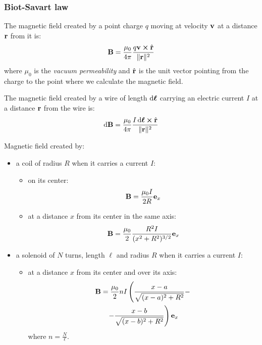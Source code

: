 \documentclass[../../../main.tex]{subfiles}
\begin{document}
\begin{multicols}{2}
  \subsubsection{Biot-Savart law}
  \begin{proposition}
    The magnetic field created by a point charge $q$ moving at velocity $\boldsymbol{\mathrm{v}}$ at a distance $\boldsymbol{\mathrm{r}}$ from it is:
    $$\vf{B}=\frac{\mu_0}{4\pi}\frac{q\vf{v}\crossprod\Hat{\vf{r}}}{\|\vf{r}\|^2}$$ where $\mu_0$ is the \emph{vacuum permeability} and $\Hat{\boldsymbol{\mathrm{r}}}$ is the unit vector pointing from the charge to the point where we calculate the magnetic field.
  \end{proposition}
  \begin{law}
    The magnetic field created by a wire of length $\dd{\boldsymbol{\mathrm{\ell}}}$ carrying an electric current $I$ at a distance $\boldsymbol{\mathrm{r}}$ from the wire is: $$\dd{\vf{B}}=\frac{\mu_0}{4\pi}\frac{I\dd{\vf{\ell}}\crossprod\hat{\vf{r}}}{\|\vf{r}\|^2}$$
  \end{law}
  \begin{proposition}
    Magnetic field created by:
    \begin{itemize}
      \item a coil of radius $R$ when it carries a current $I$:
            \begin{itemize}
              \item on its center: $$\boldsymbol{\mathrm{B}}=\frac{\mu_0I}{2R}\boldsymbol{\mathrm{e}}_x$$
              \item at a distance $x$ from its center in the same axis: $$\boldsymbol{\mathrm{B}}=\frac{\mu_0}{2}\frac{R^2I}{(x^2+R^2)^{3/2}}\boldsymbol{\mathrm{e}}_x$$
            \end{itemize}
      \item a solenoid of $N$ turns, length $\ell$ and radius $R$ when it carries a current $I$:
            \begin{itemize}
              \item at a distance $x$ from its center and over its axis:
                    \begin{multline*} \boldsymbol{\mathrm{B}}=\frac{\mu_0}{2}nI\left(\frac{x-a}{\sqrt{(x-a)^2+R^2}}-\right.\\\left.-\frac{x-b}{\sqrt{(x-b)^2+R^2}}\right)\boldsymbol{\mathrm{e}}_x
                    \end{multline*} where $n=\frac{N}{\ell}$.
                    \begin{center}
                      \begin{minipage}{\linewidth}
                        \centering
                        

\end{minipage}
\end{center}
\end{itemize}
\end{itemize}
\end{proposition}
\end{multicols}
\end{document}
